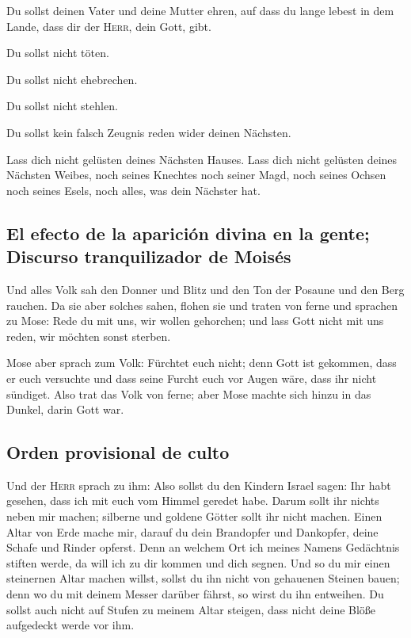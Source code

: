  Du sollst deinen Vater und deine Mutter ehren, auf dass
du lange lebest in dem Lande, dass dir der \textsc{Herr}, dein Gott,
gibt.

 Du sollst nicht töten.

 Du sollst nicht ehebrechen.

 Du sollst nicht stehlen.

 Du sollst kein falsch Zeugnis reden wider deinen
Nächsten.

 Lass dich nicht gelüsten deines Nächsten Hauses. Lass
dich nicht gelüsten deines Nächsten Weibes, noch seines Knechtes noch
seiner Magd, noch seines Ochsen noch seines Esels, noch alles, was dein
Nächster hat.

\hypertarget{el-efecto-de-la-apariciuxf3n-divina-en-la-gente-discurso-tranquilizador-de-moisuxe9s}{%
\subsection{El efecto de la aparición divina en la gente; Discurso
tranquilizador de
Moisés}\label{el-efecto-de-la-apariciuxf3n-divina-en-la-gente-discurso-tranquilizador-de-moisuxe9s}}

 Und alles Volk sah den Donner und Blitz und den Ton der
Posaune und den Berg rauchen. Da sie aber solches sahen, flohen sie und
traten von ferne  und sprachen zu Mose: Rede du mit uns,
wir wollen gehorchen; und lass Gott nicht mit uns reden, wir möchten
sonst sterben.

 Mose aber sprach zum Volk: Fürchtet euch nicht; denn
Gott ist gekommen, dass er euch versuchte und dass seine Furcht euch vor
Augen wäre, dass ihr nicht sündiget.  Also trat das Volk
von ferne; aber Mose machte sich hinzu in das Dunkel, darin Gott war.

\hypertarget{orden-provisional-de-culto}{%
\subsection{Orden provisional de
culto}\label{orden-provisional-de-culto}}

 Und der \textsc{Herr} sprach zu ihm: Also sollst du den
Kindern Israel sagen: Ihr habt gesehen, dass ich mit euch vom Himmel
geredet habe.  Darum sollt ihr nichts neben mir machen;
silberne und goldene Götter sollt ihr nicht machen. 
Einen Altar von Erde mache mir, darauf du dein Brandopfer und Dankopfer,
deine Schafe und Rinder opferst. Denn an welchem Ort ich meines Namens
Gedächtnis stiften werde, da will ich zu dir kommen und dich segnen.
 Und so du mir einen steinernen Altar machen willst,
sollst du ihn nicht von gehauenen Steinen bauen; denn wo du mit deinem
Messer darüber fährst, so wirst du ihn entweihen.  Du
sollst auch nicht auf Stufen zu meinem Altar steigen, dass nicht deine
Blöße aufgedeckt werde vor ihm.

